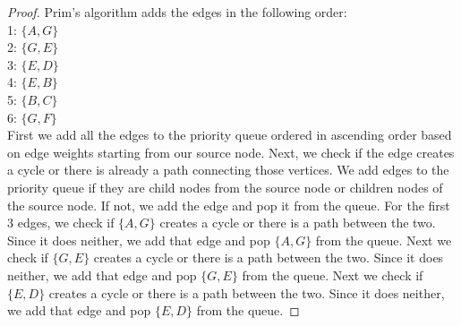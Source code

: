 \documentclass[11pt]{article}
\theoremstyle{definition}
\theoremstyle{definition}
\theoremstyle{definition}
\begin{document}
\begin{proof}
Prim's algorithm adds the edges in the following order:\\
1: $\{A, G\}$\\
2: $\{G, E\}$\\
3: $\{E, D\}$\\
4: $\{E, B\}$\\
5: $\{B, C\}$\\
6: $\{G, F\}$\\

First we add all the edges to the priority queue ordered in ascending order based on edge weights starting from our source node. Next, we check if the edge creates a cycle or there is already a path connecting those vertices. We add edges to the priority queue if they are child nodes from the source node or children nodes of the source node. If not, we add the edge and pop it from the queue. For the first 3 edges, we check if $\{A, G\}$ creates a cycle or there is a path between the two. Since it does neither, we add that edge and pop $\{A, G\}$ from the queue. Next we check if $\{G, E\}$ creates a cycle or there is a path between the two. Since it does neither, we add that edge and pop $\{G, E\}$ from the queue. Next we check if $\{E, D\}$ creates a cycle or there is a path between the two. Since it does neither, we add that edge and pop $\{E, D\}$ from the queue.
\end{proof}
\end{document}
